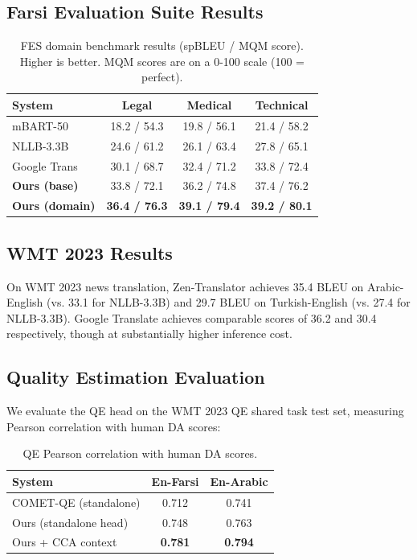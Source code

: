 \documentclass[11pt,twocolumn]{article}
\begin{document}
\subsection{Farsi Evaluation Suite Results}

\begin{table}[h]
\centering
\caption{FES domain benchmark results (spBLEU / MQM score). Higher is better.
MQM scores are on a 0-100 scale (100 = perfect).}
\label{tab:fes}
\begin{tabular}{lccc}
\toprule
\textbf{System} & \textbf{Legal} & \textbf{Medical} & \textbf{Technical} \\
\midrule
mBART-50     & 18.2 / 54.3 & 19.8 / 56.1 & 21.4 / 58.2 \\
NLLB-3.3B    & 24.6 / 61.2 & 26.1 / 63.4 & 27.8 / 65.1 \\
Google Trans & 30.1 / 68.7 & 32.4 / 71.2 & 33.8 / 72.4 \\
\textbf{Ours (base)} & 33.8 / 72.1 & 36.2 / 74.8 & 37.4 / 76.2 \\
\textbf{Ours (domain)} & \textbf{36.4 / 76.3} & \textbf{39.1 / 79.4} & \textbf{39.2 / 80.1} \\
\bottomrule
\end{tabular}
\end{table}

\subsection{WMT 2023 Results}

On WMT 2023 news translation, Zen-Translator achieves 35.4 BLEU on
Arabic-English (vs. 33.1 for NLLB-3.3B) and 29.7 BLEU on Turkish-English
(vs. 27.4 for NLLB-3.3B). Google Translate achieves comparable scores
of 36.2 and 30.4 respectively, though at substantially higher inference cost.

\subsection{Quality Estimation Evaluation}

We evaluate the QE head on the WMT 2023 QE shared task test set, measuring
Pearson correlation with human DA scores:

\begin{table}[h]
\centering
\caption{QE Pearson correlation with human DA scores.}
\label{tab:qe}
\begin{tabular}{lcc}
\toprule
\textbf{System} & \textbf{En-Farsi} & \textbf{En-Arabic} \\
\midrule
COMET-QE (standalone) & 0.712 & 0.741 \\
Ours (standalone head) & 0.748 & 0.763 \\
Ours + CCA context & \textbf{0.781} & \textbf{0.794} \\
\bottomrule
\end{tabular}
\end{table}
\end{document}
